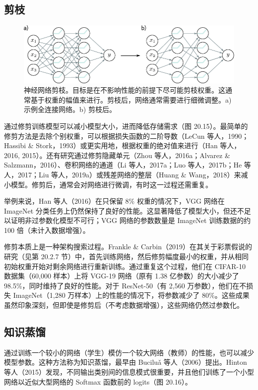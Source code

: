 \documentclass[lang=cn,newtx,10pt,scheme=chinese]{elegantbook}
\begin{document}
\subsection{剪枝}
\begin{figure}[ht!]
\centering
\includegraphics[width=0.7\linewidth]{PDFFigures/UDLChap21PDF/WhyPruning.pdf}
\caption{神经网络剪枝。目标是在不影响性能的前提下尽可能剪枝权重。这通常基于权重的幅值来进行。剪枝后，网络通常需要进行细微调整。a) 示例全连接网络。b) 剪枝后。}
\end{figure}
通过修剪训练模型可以减小模型大小，进而降低存储需求（图 20.15）。最简单的修剪方法是去除个别权重，可以根据损失函数的二阶导数（LeCun 等人，1990；Hassibi \& Stork，1993）或更实用地，根据权重的绝对值来进行（Han 等人，2016, 2015）。还有研究通过修剪隐藏单元（Zhou 等人，2016a；Alvarez \& Salzmann，2016）、卷积网络的通道（Li 等人，2017a；Luo 等人，2017b；He 等人，2017；Liu 等人，2019a）或残差网络的整层（Huang \& Wang，2018）来减小模型。修剪后，通常会对网络进行微调，有时这一过程还需重复。

举例来说，Han 等人（2016）在只保留 8\% 权重的情况下，VGG 网络在 ImageNet 分类任务上仍然保持了良好的性能。这显著降低了模型大小，但还不足以证明非过参数化模型不可行；VGG 网络的参数数量是 ImageNet 训练数据的约 100 倍（未计入数据增强）。

修剪本质上是一种架构搜索过程。Frankle \& Carbin（2019）在其关于彩票假说的研究（见第 20.2.7 节）中，首先训练网络，然后修剪幅度最小的权重，并从相同初始权重开始对剩余网络进行重新训练。通过重复这个过程，他们在 CIFAR-10 数据集（60,000 样本）上将 VGG-19 网络（原有 1.38 亿参数）的大小减少了 98.5\%，同时维持了良好的性能。对于 ResNet-50（有 2,560 万参数），他们在不损失 ImageNet（1,280 万样本）上的性能的情况下，将参数减少了 80\%。这些成果虽然印象深刻，但即使是修剪后（不考虑数据增强），这些网络仍然过参数化。

\subsection{知识蒸馏}
通过训练一个较小的网络（学生）模仿一个较大网络（教师）的性能，也可以减少模型参数。这种方法称为知识蒸馏，最早由 Buciluǎ 等人（2006）提出。Hinton 等人（2015）发现，不同输出类别间的信息模式很重要，并且他们训练了一个小型网络以近似大型网络的 Softmax 函数前的 logits（图 20.16）。
\end{document}
